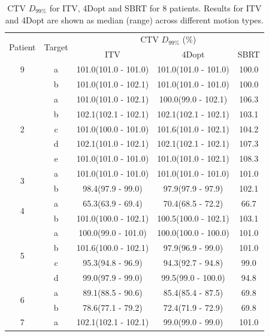\documentclass[type=dr, dr=rernat, accentcolor=tud7b,colorbacktitle, bigchapter, openright, twoside, 12pt ]{tudthesis}
\begin{document}

\begin{table}[H]
	\centering
	\caption{CTV $D_{99\%}$ for ITV, 4Dopt and SBRT for 8 patients. Results for ITV and 4Dopt are shown as median (range) across different motion types.}
	\begin{tabular}{c|c|c|c|c}
		\hline\hline
		\multirow{2}{*}{Patient} & \multirow{2}{*}{Target} & \multicolumn{3}{|c}{CTV $D_{99\%}$ (\%)}  \\
		 &  & ITV & 4Dopt & SBRT \\
		 \hline9
		 
\multirow{2}{*}{1} & a & 101.0(101.0 - 101.0) & 101.0(101.0 - 101.0) & 100.0\\ 
 & b & 101.0(101.0 - 102.1) & 101.0(101.0 - 101.0) & 100.0\\ 
 \hline
\multirow{5}{*}{2} & a & 101.0(101.0 - 102.1) & 100.0(99.0 - 102.1) & 106.3\\ 
 & b & 102.1(102.1 - 102.1) & 102.1(102.1 - 102.1) & 103.1\\ 
 & c & 101.0(100.0 - 101.0) & 101.6(101.0 - 102.1) & 104.2\\ 
 & d & 102.1(101.0 - 102.1) & 102.1(102.1 - 102.1) & 107.3\\ 
 & e & 101.0(101.0 - 101.0) & 101.0(101.0 - 102.1) & 108.3\\ 
 \hline
\multirow{2}{*}{3} & a & 101.0(101.0 - 101.0) & 101.0(101.0 - 101.0) & 101.0\\ 
 & b & 98.4(97.9 - 99.0) & 97.9(97.9 - 97.9) & 102.1\\ 
 \hline
\multirow{2}{*}{4} & a & 65.3(63.9 - 69.4) & 70.4(68.5 - 72.2) & 66.7\\ 
 & b & 101.0(100.0 - 102.1) & 100.5(100.0 - 102.1) & 103.1\\ 
 \hline
\multirow{4}{*}{5} & a & 100.0(99.0 - 101.0) & 100.0(100.0 - 100.0) & 101.0\\ 
 & b & 101.6(100.0 - 102.1) & 97.9(96.9 - 99.0) & 101.0\\ 
 & c & 95.3(94.8 - 96.9) & 94.3(92.7 - 94.8) & 99.0\\ 
 & d & 99.0(97.9 - 99.0) & 99.5(99.0 - 100.0) & 94.8\\ 
 \hline
\multirow{2}{*}{6} & a & 89.1(88.5 - 90.6) & 85.4(85.4 - 87.5) & 69.8\\ 
 & b & 78.6(77.1 - 79.2) & 72.4(71.9 - 72.9) & 69.8\\ 
 \hline
\multirow{2}{*}{7} & a & 102.1(102.1 - 102.1) & 99.0(99.0 - 99.0) & 101.0\\ 

\end{tabular}
\end{table}
\end{document}
